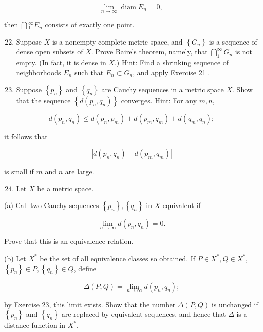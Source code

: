 \documentclass[10pt]{article}
\begin{document}
$$
\lim _{n \rightarrow \infty} \operatorname{diam} E_{n}=0 \text {, }
$$

then $\bigcap{ }_{1}^{\infty} E_{n}$ consists of exactly one point.

\begin{enumerate}
  \setcounter{enumi}{21}
  \item Suppose $X$ is a nonempty complete metric space, and $\left\{G_{n}\right\}$ is a sequence of dense open subsets of $X$. Prove Baire's theorem, namely, that $\bigcap_{1}^{\infty} G_{n}$ is not empty. (In fact, it is dense in $X$.) Hint: Find a shrinking sequence of neighborhoods $E_{n}$ such that $E_{n} \subset G_{n}$, and apply Exercise 21 .

  \item Suppose $\left\{p_{n}\right\}$ and $\left\{q_{n}\right\}$ are Cauchy sequences in a metric space $X$. Show that the sequence $\left\{d\left(p_{n}, q_{n}\right)\right\}$ converges. Hint: For any $m, n$,

\end{enumerate}

$$
d\left(p_{n}, q_{n}\right) \leq d\left(p_{n}, p_{m}\right)+d\left(p_{m}, q_{m}\right)+d\left(q_{m}, q_{n}\right) ;
$$

it follows that

$$
\left|d\left(p_{n}, q_{n}\right)-d\left(p_{m}, q_{m}\right)\right|
$$

is small if $m$ and $n$ are large.

\begin{enumerate}
  \setcounter{enumi}{23}
  \item Let $X$ be a metric space.
\end{enumerate}

(a) Call two Cauchy sequences $\left\{p_{n}\right\},\left\{q_{n}\right\}$ in $X$ equivalent if

$$
\lim _{n \rightarrow \infty} d\left(p_{n}, q_{n}\right)=0 .
$$

Prove that this is an equivalence relation.

(b) Let $X^{*}$ be the set of all equivalence classes so obtained. If $P \in X^{*}, Q \in X^{*}$, $\left\{p_{n}\right\} \in P,\left\{q_{n}\right\} \in Q$, define

$$
\Delta(P, Q)=\lim _{n \rightarrow \infty} d\left(p_{n}, q_{n}\right) ;
$$

by Exercise 23, this limit exists. Show that the number $\Delta(P, Q)$ is unchanged if $\left\{p_{n}\right\}$ and $\left\{q_{n}\right\}$ are replaced by equivalent sequences, and hence that $\Delta$ is a distance function in $X^{*}$.
\end{document}
